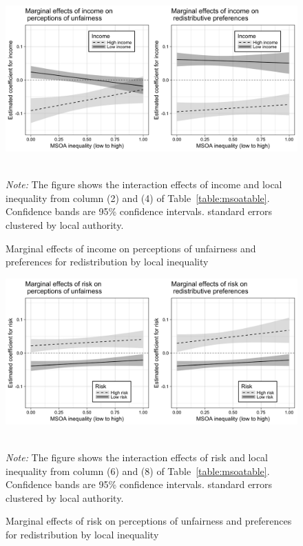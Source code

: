 \documentclass[12pt, letter]{scrartcl}
\begin{document}
\begin{figure}[t]
\caption{Marginal effects of income on perceptions of unfairness and preferences for redistribution by local inequality}
\centering
\vspace{10pt}
\includegraphics[scale=0.16]{b1to2.png}
\label{fig:12}
{\footnotesize \\ \textit{Note:} The figure shows the interaction effects of income and local inequality from column (2) and (4) of Table~\ref{table:msoatable}. Confidence bands are 95\% confidence intervals. standard errors clustered by local authority. \par}
\end{figure}

\begin{figure}[t]
\caption{Marginal effects of risk on perceptions of unfairness and preferences for redistribution by local inequality}
\centering
\vspace{10pt}
\includegraphics[scale=0.16]{b3to4.png}
\label{fig:34}
{\footnotesize \\ \textit{Note:} The figure shows the interaction effects of risk and local inequality from column (6) and (8) of Table~\ref{table:msoatable}. Confidence bands are 95\% confidence intervals. standard errors clustered by local authority.\par}
\end{figure}
\end{document}
